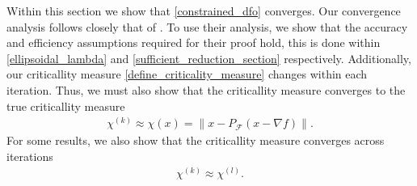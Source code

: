 \documentclass{article}
\theoremstyle{case}
\numberwithin{theorem}{subsection}
\newcommand{\chik}{{\chi^{(k)}}}
\newcommand{\chil}{{\chi^{(l)}}}
\newcommand{\feasible}{{\mathcal F}}
\newcommand{\gradf}{\nabla f}
\begin{document}
Within this section we show that \cref{constrained_dfo} converges.
Our convergence analysis follows closely that of \cite{Conejo:2013:GCT:2620806.2621814}.
To use their analysis, we show that the accuracy and efficiency assumptions required for their proof hold, 
this is done within \cref{ellipsoidal_lambda} and \cref{sufficient_reduction_section} respectively.
Additionally, our criticallity measure \cref{define_criticality_measure} changes within each iteration.
Thus, we must also show that the criticallity measure converges to the true criticallity measure
\begin{align}
\label{verbiage_hoffman_use_one}
\chik \approx \chi (x) = \left \| x - P_{\feasible}\left( x - \gradf\right) \right \|.
\end{align}
For some results, we also show that the criticallity measure converges across iterations
\begin{align}
\label{verbiage_hoffman_use_two}
\chik \approx \chil.
\end{align}
\end{document}
